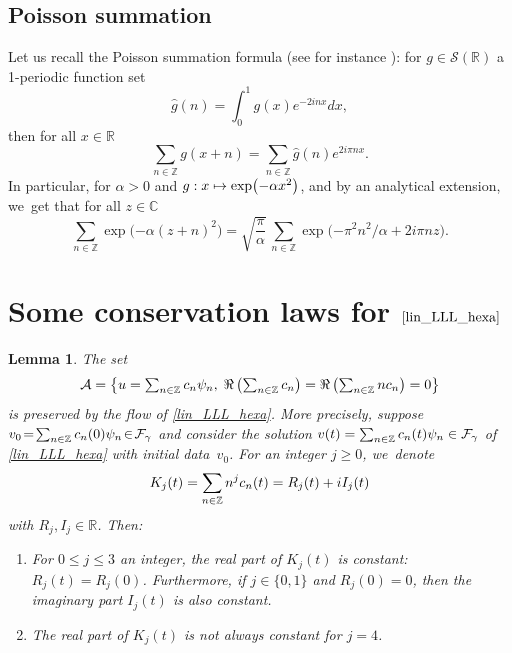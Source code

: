 \documentclass[10pt]{amsart}
\newcommand\mto{\mathchoice{\longmapsto}{\mapsto}{\mapsto}{\mapsto}}
\newtheorem{lemme}[theorem]{Lemma}
\theoremstyle{definition}
\let\EE\exp
\let\dis\relax
\newcommand\C{\mathbb C}
\newcommand\R{\mathbb R}
\newcommand\Z{\mathbb Z}
\newcommand{\pa}[1]{\left(#1\right)}
\newcommand{\paa}[1]{\left\{#1\right\}}
\begin{document}
\subsection{Poisson summation}
Let us recall the Poisson summation formula (see for instance \cite[Chap.\,VII]{SteinWeiss}): for $g \in \mathscr{S}(\R)$ a 1-periodic function set
\[
\hat{g}(n)=\int_0^1g(x)e^{-2inx}dx,
\]
then for all $ x \in \R$
\begin{equation}\label{PF}
\sum_{n \in \Z}g(x+n)=\sum_{n \in \Z}\hat{g}(n)e^{2i \pi n x}.
\end{equation}
In particular, for $\alpha >0$ and $g: x \mto \EE\bigl({-\alpha x^2}\bigr)$, and by an analytical extension, we~get that for all $z \in \C$
\begin{equation}\label{PF1}
\sum_{n \in \Z} \EE\bigl({-\alpha (z+n)^2}\bigr) =\sqrt{\frac{\pi}{\alpha}}\, \sum_{n \in \Z} \EE\bigl({-{\pi^2 n^2 }/{\alpha}+2 i \pi n z}\bigr).
\end{equation}

\section{Some conservation laws for \texorpdfstring{$\ref{lin_LLL_hexa}$}{ref}}

\begin{lemme}\label{lemme_conserv_hyp1}
The set\vspace*{-3pt}
\[\textstyle
\dis \mathcal{A} = \paa{ u = \sum_{n\in\Z} c_n\psi_n, \; \Re\pa{\sum_{n\in\Z}c_n} = \Re\pa{\sum_{n\in\Z}nc_n} = 0 } 
\]
is preserved by the flow of \eqref{lin_LLL_hexa}. More precisely, suppose \hbox{$\dis v_0 \!=\! \sum_{n\in\Z} c_n(0)\psi_n \!\in\! \mathcal{F}_\gamma$} and consider the solution $\dis v(t)= \sum_{n\in\Z} c_n(t)\psi_n \in \mathcal{F}_\gamma$ of \eqref{lin_LLL_hexa} with initial data~$v_0$. For an integer $j \geq 0$, we~denote\vspace*{-3pt}
\[
\dis K_j(t) = \sum_{n\in\Z}{n^jc_n(t)} = R_j(t) +iI_j(t)
\]
with $R_j,I_j \in \R$. Then:
\begin{enumerate}
\item For $0 \leq j \leq 3$ an integer, the real part of $K_j(t)$ is constant: $R_j(t) = R_j(0)$. Furthermore, if $j\in\{ 0,1\}$ and $R_j(0) = 0$, then the imaginary part $I_j(t)$ is also constant.
\item The real part of $K_j(t)$ is \emph{not always} constant for $j = 4$.
\end{enumerate}
\end{lemme}
\end{document}
